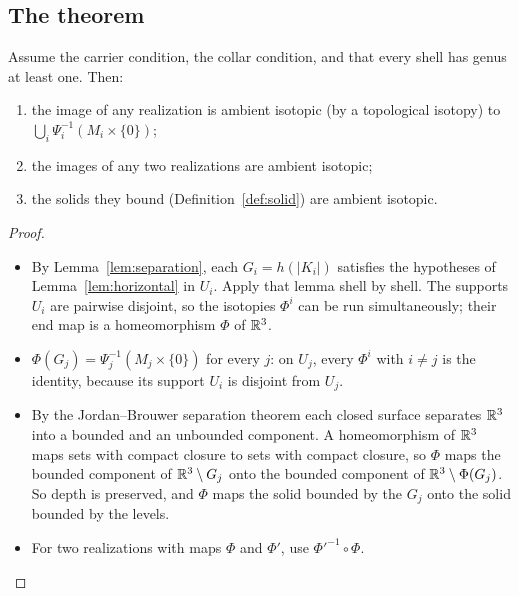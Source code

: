 \subsection{The theorem}

\begin{theorem}[Uniqueness]\label{thm:uniqueness}
Assume the carrier condition, the collar condition, and that every shell has genus at least one. Then:
\begin{enumerate}
\item the image of any realization is ambient isotopic (by a topological isotopy) to
$\bigcup_i\Psi_i^{-1}(M_i\times\{0\})$;
\item the images of any two realizations are ambient isotopic;
\item the solids they bound (Definition~\ref{def:solid}) are ambient isotopic.
\end{enumerate}
\end{theorem}
\begin{proof}
\begin{itemize}
\item By Lemma~\ref{lem:separation}, each $G_i=h(|K_i|)$ satisfies the hypotheses of Lemma~\ref{lem:horizontal} in
$U_i$. Apply that lemma shell by shell. The supports $U_i$ are pairwise disjoint, so the isotopies $\Phi^i$ can be
run simultaneously; their end map is a homeomorphism $\Phi$ of $\mathbb{R}^3$.
\item $\Phi(G_j)=\Psi_j^{-1}(M_j\times\{0\})$ for every $j$: on $U_j$, every $\Phi^i$ with $i\ne j$ is the identity,
because its support $U_i$ is disjoint from $U_j$.
\item By the Jordan--Brouwer separation theorem each closed surface separates $\mathbb{R}^3$ into a bounded and an unbounded
component. A homeomorphism of $\mathbb{R}^3$ maps sets with compact closure to sets with compact closure, so $\Phi$ maps the
bounded component of $\mathbb{R}^3\setminus G_j$ onto the bounded component of $\mathbb{R}^3\setminus\Phi(G_j)$. So depth is
preserved, and $\Phi$ maps the solid bounded by the $G_j$ onto the solid bounded by the levels.
\item For two realizations with maps $\Phi$ and $\Phi'$, use $\Phi'^{-1}\circ\Phi$.
\end{itemize}
\end{proof}

